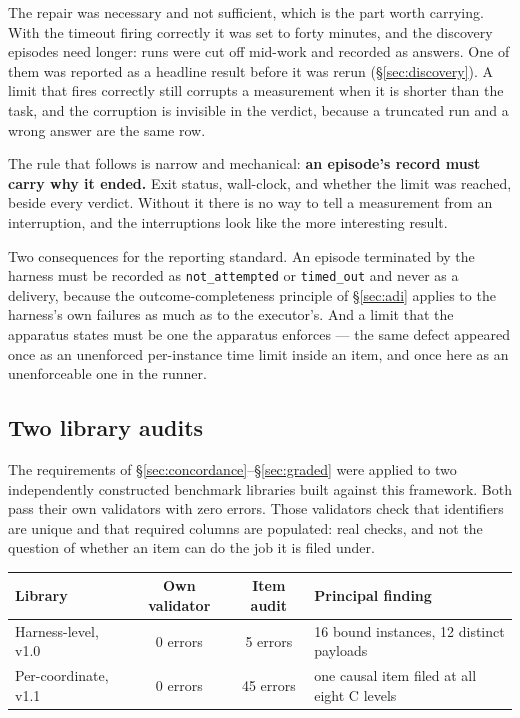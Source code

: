 \documentclass[11pt]{article}
\theoremstyle{definition}
\begin{document}
The repair was necessary and not sufficient, which is the part worth carrying. With the timeout firing correctly it was set to forty minutes, and the discovery episodes need longer: runs were cut off mid-work and recorded as answers. One of them was reported as a headline result before it was rerun (\S\ref{sec:discovery}). A limit that fires correctly still corrupts a measurement when it is shorter than the task, and the corruption is invisible in the verdict, because a truncated run and a wrong answer are the same row.

The rule that follows is narrow and mechanical: \textbf{an episode's record must carry why it ended.} Exit status, wall-clock, and whether the limit was reached, beside every verdict. Without it there is no way to tell a measurement from an interruption, and the interruptions look like the more interesting result.

Two consequences for the reporting standard. An episode terminated by the harness must be recorded as \texttt{not\_attempted} or \texttt{timed\_out} and never as a delivery, because the outcome-completeness principle of \S\ref{sec:adi} applies to the harness's own failures as much as to the executor's. And a limit that the apparatus states must be one the apparatus enforces --- the same defect appeared once as an unenforced per-instance time limit inside an item, and once here as an unenforceable one in the runner.

\subsection{Two library audits}\label{sec:libraries}

The requirements of \S\ref{sec:concordance}--\S\ref{sec:graded} were applied to two independently constructed benchmark libraries built against this framework. Both pass their own validators with zero errors. Those validators check that identifiers are unique and that required columns are populated: real checks, and not the question of whether an item can do the job it is filed under.

\begin{table}[h]
\centering\small
\begin{tabularx}{\textwidth}{@{}lccY@{}}
\toprule
Library & Own validator & Item audit & Principal finding \\
\midrule
Harness-level, v1.0 & 0 errors & 5 errors & 16 bound instances, 12 distinct payloads \\
Per-coordinate, v1.1 & 0 errors & 45 errors & one causal item filed at all eight C levels \\
\bottomrule
\end{tabularx}
\end{table}
\end{document}
